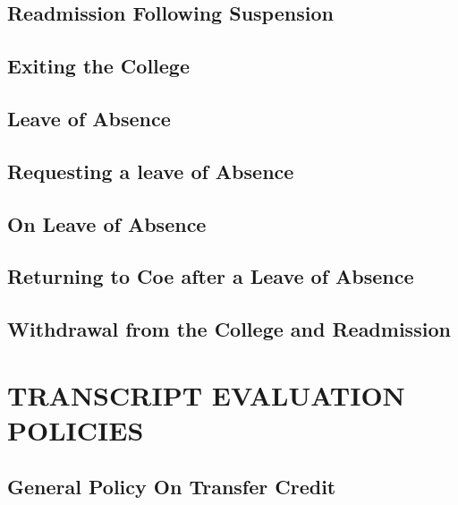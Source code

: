 \documentclass[
  letterpaper,
]{scrbook}
\begin{document}
\hypertarget{readmission-following-suspension}{%
\section{Readmission Following
Suspension}\label{readmission-following-suspension}}

\hypertarget{exiting-the-college}{%
\section{Exiting the College}\label{exiting-the-college}}

\hypertarget{leave-of-absence}{%
\section{Leave of Absence}\label{leave-of-absence}}

\hypertarget{requesting-a-leave-of-absence}{%
\section{Requesting a leave of
Absence}\label{requesting-a-leave-of-absence}}

\hypertarget{on-leave-of-absence}{%
\section{On Leave of Absence}\label{on-leave-of-absence}}

\hypertarget{returning-to-coe-after-a-leave-of-absence}{%
\section{Returning to Coe after a Leave of
Absence}\label{returning-to-coe-after-a-leave-of-absence}}

\hypertarget{withdrawal-from-the-college-and-readmission}{%
\section{Withdrawal from the College and
Readmission}\label{withdrawal-from-the-college-and-readmission}}

\hypertarget{transcript-evaluation-policies}{%
\chapter{TRANSCRIPT EVALUATION
POLICIES}\label{transcript-evaluation-policies}}

\hypertarget{general-policy-on-transfer-credit}{%
\section{General Policy On Transfer
Credit}\label{general-policy-on-transfer-credit}}
\end{document}
